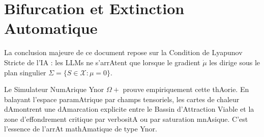 \documentclass[11pt,a4paper]{article}
\begin{document}
\section{Bifurcation et Extinction Automatique}

La conclusion majeure de ce document repose sur la Condition de Lyapunov Stricte de l'IA : les LLMs ne s'arrAtent que lorsque le gradient $\dot\mu$ les dirige sous le plan singulier $\Sigma = \{S \in \mathcal{X} : \mu = 0\}$.



Le Simulateur NumArique Ynor $\Omega+$ prouve empiriquement cette thAorie. En balayant l'espace paramAtrique par champs tensoriels, les cartes de chaleur dAmontrent une dAmarcation explicite entre le Bassin d'Attraction Viable et la zone d'effondrement critique par verbositA ou par saturation mnAsique. C'est l'essence de l'arrAt mathAmatique de type Ynor.
\end{document}
